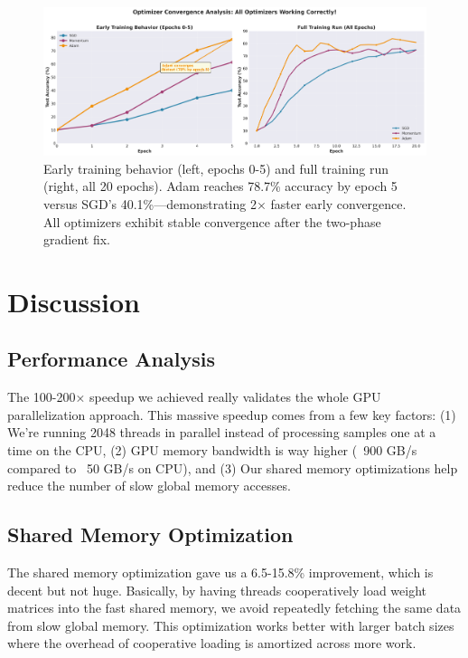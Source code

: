 \documentclass[conference]{IEEEtran}
\begin{document}
\begin{figure}[htbp]
\centerline{\includegraphics[width=\columnwidth]{optimizer_convergence_analysis.png}}
\caption{Early training behavior (left, epochs 0-5) and full training run (right, all 20 epochs). Adam reaches 78.7\% accuracy by epoch 5 versus SGD's 40.1\%—demonstrating 2× faster early convergence. All optimizers exhibit stable convergence after the two-phase gradient fix.}
\label{fig:convergence_plot}
\end{figure}

\section{Discussion}

\subsection{Performance Analysis}

The 100-200× speedup we achieved really validates the whole GPU parallelization approach. This massive speedup comes from a few key factors: (1) We're running 2048 threads in parallel instead of processing samples one at a time on the CPU, (2) GPU memory bandwidth is way higher (~900 GB/s compared to ~50 GB/s on CPU), and (3) Our shared memory optimizations help reduce the number of slow global memory accesses.

\subsection{Shared Memory Optimization}

The shared memory optimization gave us a 6.5-15.8\% improvement, which is decent but not huge. Basically, by having threads cooperatively load weight matrices into the fast shared memory, we avoid repeatedly fetching the same data from slow global memory. This optimization works better with larger batch sizes where the overhead of cooperative loading is amortized across more work.
\end{document}
